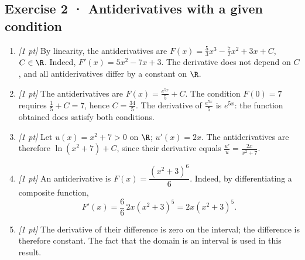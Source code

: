 \subsection*{Exercise 2 · Antiderivatives with a given condition}\begin{enumerate}

\item \textit{[1 pt]} By linearity, the antiderivatives are $F(x)=\frac{5}{3}x^3-\frac{7}{2}x^2+3x+C$, $C\in\R$. Indeed, $F'(x)=5x^2-7x+3$. The derivative does not depend on $C$, and all antiderivatives differ by a constant on $\R$.

\item \textit{[1 pt]} The antiderivatives are $F(x)=\frac{e^{5x}}{5}+C$. The condition $F(0)=7$ requires $\frac{1}{5}+C=7$, hence $C=\frac{34}{5}$. The derivative of $\frac{e^{5x}}{5}$ is $e^{5x}$: the function obtained does satisfy both conditions.

\item \textit{[1 pt]} Let $u(x)=x^2+7>0$ on $\R$; $u'(x)=2x$. The antiderivatives are therefore $\ln(x^2+7)+C$, since their derivative equals $\frac{u'}{u}=\frac{2x}{x^2+7}$.

\item \textit{[1 pt]} An antiderivative is $F(x)=\dfrac{(x^2+3)^{6}}{6}$. Indeed, by differentiating a composite function,
\[F'(x)=\frac{6}{6}\,2x(x^2+3)^{5}=2x(x^2+3)^{5}.\]

\item \textit{[1 pt]} The derivative of their difference is zero on the interval; the difference is therefore constant. The fact that the domain is an interval is used in this result.

\end{enumerate}

